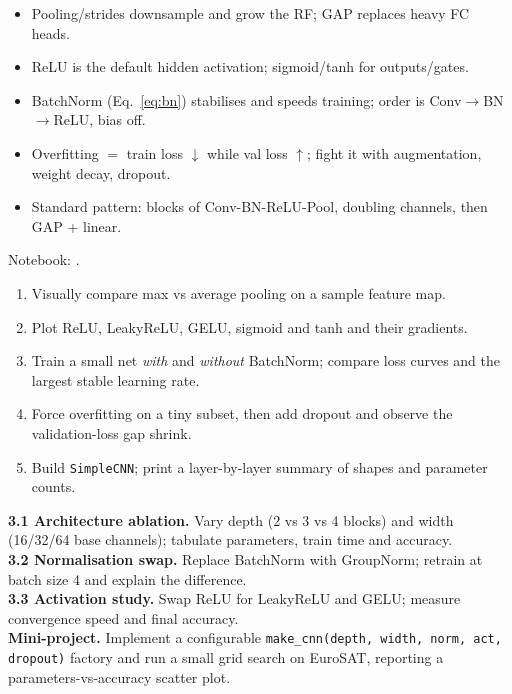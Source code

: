 \begin{keybox}
\begin{itemize}[leftmargin=1.2em,nosep]
  \item Pooling/strides downsample and grow the RF; GAP replaces heavy FC heads.
  \item ReLU is the default hidden activation; sigmoid/tanh for outputs/gates.
  \item BatchNorm (Eq.~\ref{eq:bn}) stabilises and speeds training; order is Conv$\to$BN$\to$ReLU, bias off.
  \item Overfitting $=$ train loss $\downarrow$ while val loss $\uparrow$; fight it with augmentation, weight decay, dropout.
  \item Standard pattern: blocks of Conv-BN-ReLU-Pool, doubling channels, then GAP + linear.
\end{itemize}
\end{keybox}

\begin{practbox}
Notebook: .
\begin{enumerate}[leftmargin=1.4em,nosep]
  \item Visually compare max vs average pooling on a sample feature map.
  \item Plot ReLU, LeakyReLU, GELU, sigmoid and tanh and their gradients.
  \item Train a small net \emph{with} and \emph{without} BatchNorm; compare loss
  curves and the largest stable learning rate.
  \item Force overfitting on a tiny subset, then add dropout and observe the
  validation-loss gap shrink.
  \item Build \texttt{SimpleCNN}; print a layer-by-layer summary of shapes and
  parameter counts.
\end{enumerate}
\end{practbox}

\begin{exbox}
\textbf{3.1 Architecture ablation.} Vary depth (2 vs 3 vs 4 blocks) and width
(16/32/64 base channels); tabulate parameters, train time and accuracy.\\[2pt]
\textbf{3.2 Normalisation swap.} Replace BatchNorm with GroupNorm; retrain at
batch size 4 and explain the difference.\\[2pt]
\textbf{3.3 Activation study.} Swap ReLU for LeakyReLU and GELU; measure
convergence speed and final accuracy.\\[2pt]
\textbf{Mini-project.} Implement a configurable \texttt{make\_cnn(depth, width,
norm, act, dropout)} factory and run a small grid search on EuroSAT, reporting a
parameters-vs-accuracy scatter plot.
\end{exbox}
